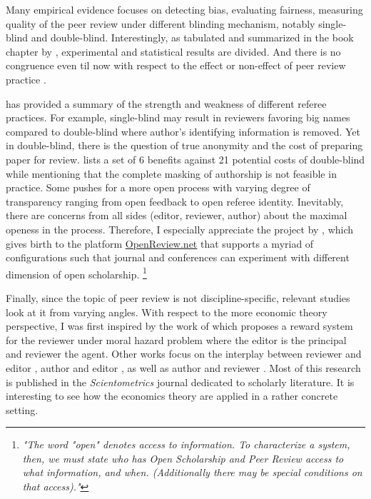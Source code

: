 \documentclass[12pt]{article}
\begin{document}
Many empirical evidence focuses on detecting bias, evaluating fairness,
measuring quality of the peer review under different blinding mechanism,
notably single-blind and double-blind. Interestingly, as tabulated and
summarized in the book chapter by \citet{largent2016blind}, experimental and
statistical results are divided. And there is no congruence even til now with
respect to the effect or non-effect of peer review practice
\cite{blank1991effects,tomkins2017reviewer}.

\citet{tan2018peer} has provided a summary of the strength and weakness of different referee practices. For example, single-blind may result in reviewers favoring big names compared to double-blind where author's identifying information is removed. Yet in double-blind, there is the question of true anonymity and the cost of preparing paper for review. \cite{snodgrass2007single} lists a set of 6 benefits against 21 potential costs of double-blind while mentioning that the complete masking of authorship is not feasible in practice. Some pushes for a more open process with varying degree of transparency ranging from open feedback to open referee identity. Inevitably, there are concerns from all sides (editor, reviewer, author) about the maximal openess in the process. Therefore, I especially appreciate the project by \citet{soergel2013open}, which gives birth to the platform \href{https://openreview.net/}{OpenReview.net} that supports a myriad of configurations such that journal and conferences can experiment with different dimension of open scholarship. \footnote{\textit{"The word "open" denotes access to information. To characterize a system, then, we must state who has Open Scholarship and Peer Review access to what information, and when. (Additionally there may be special conditions on that access)."}}

Finally, since the topic of peer review is not discipline-specific, relevant
studies look at it from varying angles. With respect to the more economic
theory perspective, I was first inspired by the work of
\citet{garcia2015principal} which proposes a reward system for the reviewer
under moral hazard problem where the editor is the principal and reviewer the
agent. Other works focus on the interplay between reviewer and editor
\citep{garcia2021interplay}, author and editor \cite{garcia2022fraud}, as well
as author and reviewer \citep{radzvilas2023incentives}. Most of this research
is published in the \textit{Scientometrics} journal dedicated to scholarly
literature. It is interesting to see how the economics theory are applied in a
rather concrete setting.
\end{document}

